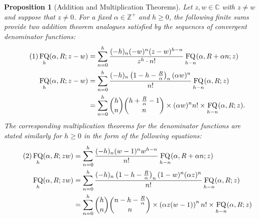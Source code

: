 \documentclass[12pt,reqno]{article}
\numberwithin{sfootnote}{section}
\numberwithin{equation}{section}
\newcommand{\tagonce}[0]{
     \addtocounter{equation}{1}
     \tag{\theequation}
}
\theoremstyle{plain}
\newtheorem{prop}[theorem]{Proposition}
\theoremstyle{definition}
\theoremstyle{remark}
\DeclareMathOperator{\FQ}{FQ}
\begin{document}
\begin{prop}[Addition and Multiplication Theorems] 
\label{cor_HypU_fn_FiniteSums_Involving_FQhz} 
Let $z, w \in \mathbb{C}$ with $z \neq w$ and suppose that $z \neq 0$. 
For a fixed $\alpha \in \mathbb{Z}^{+}$ and $h \geq 0$, the 
following finite sums provide two 
addition theorem analogues satisfied by the 
sequences of convergent denominator functions: 
\begin{align*} 
\tagonce\label{eqn_FQhaRz_HypU_FiniteSum_Idents_stmt} 
\FQ_h(\alpha, R; z-w) & = 
     \sum_{n=0}^{h} \frac{(-h)_n (-w)^n (z-w)^{h-n}}{z^{h} \cdot n!} 
     \FQ_{h-n}(\alpha, R+\alpha n; z) \\ 
\FQ_h(\alpha, R; z-w) & = 
     \sum_{n=0}^{h} \frac{(-h)_n \left(1-h-\frac{R}{\alpha}\right)_n 
     (\alpha w)^{n}}{n!} 
     \FQ_{h-n}(\alpha, R; z) \\ 
     & = 
     \sum_{n=0}^{h} \binom{h}{n} \binom{h+\frac{R}{\alpha}-1}{n} 
     \times (\alpha w)^{n} n! \times 
     \FQ_{h-n}(\alpha, R; z). 
\end{align*} 
The corresponding multiplication theorems for the 
denominator functions are stated similarly for $h \geq 0$ 
in the form of the following equations: 
\begin{align*} 
\tagonce\label{eqn_FQhaRz_HypU_FiniteSum_Idents-v_MultThms_stmts} 
\FQ_h(\alpha, R; zw) & = 
     \sum_{n=0}^{h} \frac{(-h)_n (w-1)^n w^{h-n}}{n!} 
     \FQ_{h-n}(\alpha, R+\alpha n; z) \\ 
\FQ_h(\alpha, R; zw) & = 
     \sum_{n=0}^{h} \frac{(-h)_n \left(1-h-\frac{R}{\alpha}\right)_n 
     (1-w)^{n} (\alpha z)^{n}}{n!} 
     \FQ_{h-n}(\alpha, R; z) \\ 
     & = 
     \sum_{n=0}^{h} 
     \binom{h}{n} \binom{n-h-\frac{R}{\alpha}}{n} \times 
     \left(\alpha z (w-1)\right)^{n} n! \times 
     \FQ_{h-n}(\alpha, R; z) 
\end{align*} 
\end{prop} 
\end{document}
